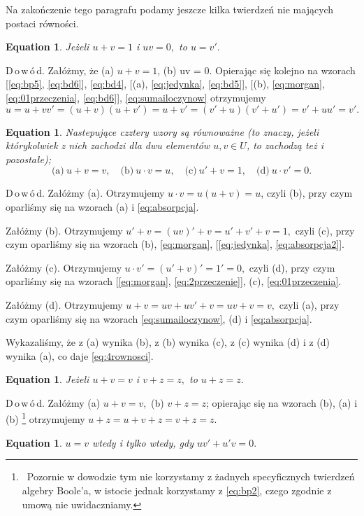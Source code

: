 \documentclass[12 pt, a4paper, leqno]{book}
\numberwithin{equation}{section}
\newcommand{\dowod}{D\,o\,w\,ó\,d}
\theoremstyle{twr}
\theoremstyle{twr}
\theoremstyle{eqtext}
\newtheorem{eqtext}[equation]{Equation}
\theoremstyle{okreslenie}
\begin{document}
Na zakończenie tego paragrafu podamy jeszcze kilka twierdzeń nie mających postaci równości.
\begin{eqtext}
\textit{Jeżeli} $u + v = 1$ \textit{i} $uv = 0,$ \textit{to} $u = v'.$
\end{eqtext}

\dowod. Załóżmy, że (a) $u + v = 1$, (b) uv = 0. Opierając się kolejno na wzorach [\eqref{eq:bp5}, \eqref{eq:bd6}], \eqref{eq:bd4}, [(a), \eqref{eq:jedynka}, \eqref{eq:bd5}],
[(b), \eqref{eq:morgan}, \eqref{eq:01przeczenia}, \eqref{eq:bd6}], \eqref{eq:sumailoczynow} otrzymujemy
\begin{displaymath}
  u = u + vv' = (u + v)(u + v') = u + v' = (v' + u)(v' + u') = v' + uu' = v'.
\end{displaymath}
\begin{eqtext} \label{eq:4rownosci}
\textit{Nastepujące czztery wzory są równoważne} (to znaczy, jeżeli którykolwiek z nich zachodzi dla dwu elementów $u,v \in U$, to zachodzą też i pozostałe);
\begin{displaymath}
\mbox{(a)}\ u + v = v, \quad \mbox{(b)}\ u \cdot v = u, \quad \mbox{(c)}\ u' + v = 1, \quad \mbox{(d)}\ u \cdot v' = 0.
\end{displaymath}
\end{eqtext}

\dowod. Załóżmy (a). Otrzymujemy $u \cdot v = u(u + v) = u$, czyli (b), przy czym oparliśmy się na wzorach (a) i \eqref{eq:absorpcja}.

Załóżmy (b). Otrzymujemy $u' + v = (uv)' + v = u' + v' + v = 1,$ czyli (c), przy czym oparliśmy się na wzorach (b), \eqref{eq:morgan}, [\eqref{eq:jedynka}, \eqref{eq:absorpcja2}].

Załóżmy (c). Otrzymujemy $u \cdot v' = (u' + v)' = 1' = 0,$  czyli (d), przy czym oparliśmy się na wzorach [\eqref{eq:morgan}, \eqref{eq:2przeczenie}], (c), \eqref{eq:01przeczenia}.

Załóżmy (d). Otrzymujemy $u + v = uv + uv' + v = uv + v = v,$ czyli (a), przy czym oparliśmy się na wzorach \eqref{eq:sumailoczynow}, (d) i \eqref{eq:absorpcja}.

Wykazaliśmy, że z (a) wynika (b), z (b) wynika (c), z (c) wynika (d) i z (d) wynika (a), co daje \eqref{eq:4rownosci}.
\begin{eqtext} \label{eq:sekwsum}
\textit{Jeżeli} $u + v = v$ \textit{i} $v + z = z,$ \textit{to} $u + z = z.$
\end{eqtext}

\dowod. Załóżmy (a) $u + v = v,$ (b) $v + z = z$; opierając się na wzorach (b), (a) i (b) \footnote{\ Pozornie w dowodzie tym nie korzystamy z żadnych specyficznych twierdzeń
algebry Boole'a, w istocie jednak korzystamy z \eqref{eq:bp2}, czego zgodnie z umową nie uwidaczniamy.} otrzymujemy $u + z = u + v + z = v + z = z.$
\begin{eqtext}
$u = v$ \textit{wtedy i tylko wtedy, gdy} $uv' + u'v = 0.$
\end{eqtext}
\end{document}
